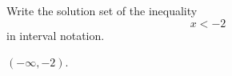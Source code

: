 
Write the solution set of the inequality
\[x<-2\]
in interval notation.

\begin{solution}
$(-\infty, -2)$.
\end{solution}
